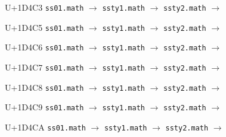\documentclass{article}
\begin{document}
\begin{substitutions}
\goodbreak

U+1D4C3  \linebreak
    \texttt{ss01.math} $\to$  \linebreak
    \texttt{ssty1.math} $\to$  \linebreak
    \texttt{ssty2.math} $\to$  

\goodbreak

U+1D4C5  \linebreak
    \texttt{ss01.math} $\to$  \linebreak
    \texttt{ssty1.math} $\to$  \linebreak
    \texttt{ssty2.math} $\to$  

\goodbreak

U+1D4C6  \linebreak
    \texttt{ss01.math} $\to$  \linebreak
    \texttt{ssty1.math} $\to$  \linebreak
    \texttt{ssty2.math} $\to$  

\goodbreak

U+1D4C7  \linebreak
    \texttt{ss01.math} $\to$  \linebreak
    \texttt{ssty1.math} $\to$  \linebreak
    \texttt{ssty2.math} $\to$  

\goodbreak

U+1D4C8  \linebreak
    \texttt{ss01.math} $\to$  \linebreak
    \texttt{ssty1.math} $\to$  \linebreak
    \texttt{ssty2.math} $\to$  

\goodbreak

U+1D4C9  \linebreak
    \texttt{ss01.math} $\to$  \linebreak
    \texttt{ssty1.math} $\to$  \linebreak
    \texttt{ssty2.math} $\to$  

\goodbreak

U+1D4CA  \linebreak
    \texttt{ss01.math} $\to$  \linebreak
    \texttt{ssty1.math} $\to$  \linebreak
    \texttt{ssty2.math} $\to$  


\end{substitutions}
\end{document}
